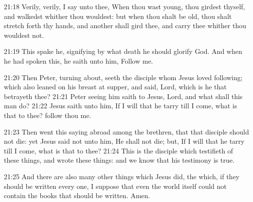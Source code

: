 21:18 Verily, verily, I say unto thee, When thou wast young, thou
girdest thyself, and walkedst whither thou wouldest: but when thou
shalt be old, thou shalt stretch forth thy hands, and another shall
gird thee, and carry thee whither thou wouldest not.

21:19 This spake he, signifying by what death he should glorify God.
And when he had spoken this, he saith unto him, Follow me.

21:20 Then Peter, turning about, seeth the disciple whom Jesus loved
following; which also leaned on his breast at supper, and said, Lord,
which is he that betrayeth thee?  21:21 Peter seeing him saith to
Jesus, Lord, and what shall this man do?  21:22 Jesus saith unto him,
If I will that he tarry till I come, what is that to thee? follow thou
me.

21:23 Then went this saying abroad among the brethren, that that
disciple should not die: yet Jesus said not unto him, He shall not
die; but, If I will that he tarry till I come, what is that to thee?
21:24 This is the disciple which testifieth of these things, and wrote
these things: and we know that his testimony is true.

21:25 And there are also many other things which Jesus did, the which,
if they should be written every one, I suppose that even the world
itself could not contain the books that should be written. Amen.

